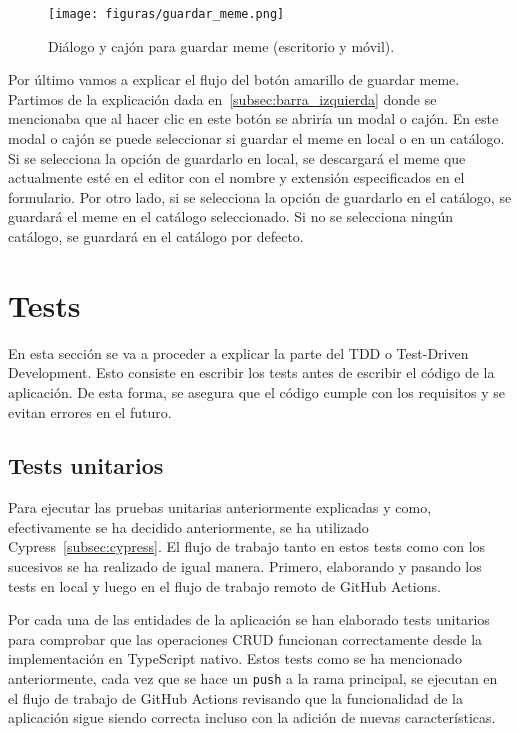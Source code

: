 \begin{figure}[H]
    \caption{Diálogo y cajón para guardar meme (escritorio y móvil).}
    \centering
    \vspace*{0.5cm}
    \texttt{[image: figuras/guardar\_meme.png]}
\end{figure}

Por último vamos a explicar el flujo del botón amarillo de guardar meme. Partimos de la explicación dada en~\ref{subsec:barra_izquierda} donde se mencionaba que al hacer clic en este botón se abriría un modal o cajón. En este modal o cajón se puede seleccionar si guardar el meme en local o en un catálogo. Si se selecciona la opción de guardarlo en local, se descargará el meme que actualmente esté en el editor con el nombre y extensión especificados en el formulario. Por otro lado, si se selecciona la opción de guardarlo en el catálogo, se guardará el meme en el catálogo seleccionado. Si no se selecciona ningún catálogo, se guardará en el catálogo por defecto.

\section{Tests}

En esta sección se va a proceder a explicar la parte del TDD o Test-Driven Development. Esto consiste en escribir los tests antes de escribir el código de la aplicación. De esta forma, se asegura que el código cumple con los requisitos y se evitan errores en el futuro.

\subsection{Tests unitarios}

Para ejecutar las pruebas unitarias anteriormente explicadas y como, efectivamente se ha decidido anteriormente, se ha utilizado Cypress~\ref{subsec:cypress}. El flujo de trabajo tanto en estos tests como con los sucesivos se ha realizado de igual manera. Primero, elaborando y pasando los tests en local y luego en el flujo de trabajo remoto de GitHub Actions.

Por cada una de las entidades de la aplicación se han elaborado tests unitarios para comprobar que las operaciones CRUD funcionan correctamente desde la implementación en TypeScript nativo. Estos tests como se ha mencionado anteriormente, cada vez que se hace un \texttt{push} a la rama principal, se ejecutan en el flujo de trabajo de GitHub Actions revisando que la funcionalidad de la aplicación sigue siendo correcta incluso con la adición de nuevas características.

